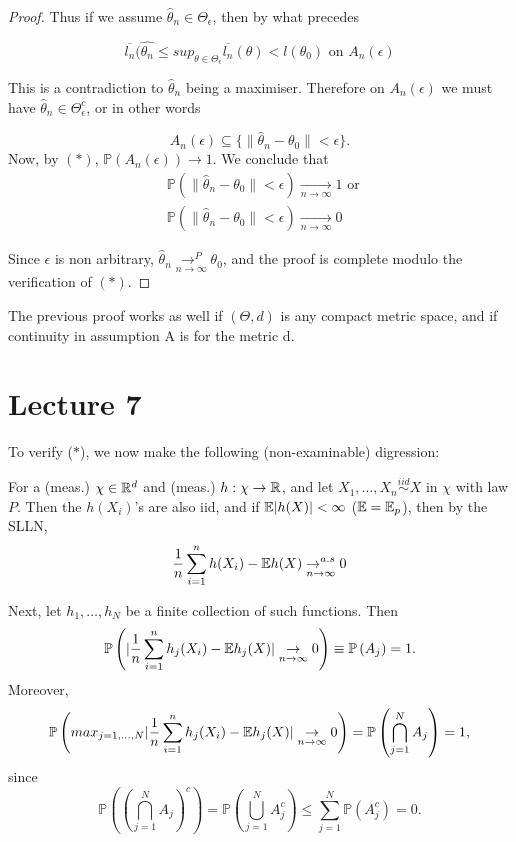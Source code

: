 \documentclass[a4paper]{article}
\begin{document}
\begin{proof}
	Thus if we assume $\hat{\theta}_n \in \Theta_{\epsilon}$, then by what precedes

	\[
		\overline{l_n}(\hat{\theta_n} \le  sup_{\theta \in \Theta_{\epsilon}} \overline{l_n}(\theta) < l(\theta_0) \text{ on } A_n(\epsilon)
	\]

	This is a contradiction to $\hat{\theta}_n$ being a maximiser. Therefore on $A_n(\epsilon)$ we must have  $\hat{\theta}_n \in  \Theta_{\epsilon}^{c}$, or in other words

	\[
		A_n(\epsilon) \subseteq \{\| \hat{\theta}_n - \theta_0\| < \epsilon\} 
	.\] 
	Now, by $(\ast)$,  $\mathbb{P}\left( A_n(\epsilon) \right) \to 1$. We conclude that
	 \begin{align*}
		&\mathbb{P}\left( \| \hat{\theta}_n - \theta_0 \| < \epsilon  \right) \underset{n\to \infty}{\to } 1 \text{ or } \\
		&\mathbb{P}\left( \| \hat{\theta}_n - \theta_0\| < \epsilon \right) \underset{n\to \infty}{\to } 0
	\end{align*}

	Since $\epsilon$ is non arbitrary,  $\hat{\theta}_n \underset{n\to \infty}{\to^{P} } \theta_0$, and the proof is complete modulo the verification of $(\ast)$.
\end{proof}

\begin{remark}
	The previous proof works as well if $(\Theta, d)$ is any compact metric space, and if continuity in assumption A is for the metric d.
\end{remark}

\section{Lecture 7}

To verify ($\ast$), we now make the following (non-examinable) digression:

For a (meas.) $\chi \in \mathbb{R}^{d}$ and (meas.) $h: \chi \to \mathbb{R}$, and let $X_1, \ldots, X_n \stackrel{iid}{\sim} X$ in $\chi$ with law $P$. Then the $h(X_i)$'s are also iid, and if $\mathbb{E} |h(X)| < \infty$ ($\mathbb{E} = \mathbb{E}_p$), then by the SLLN,
\[
	\frac{1}{n} \sum_{i=1}^{n} h(X_i) - \mathbb{E} h(X) \underset{n \to \infty}{\to^{a.s}} 0 
\] 

Next, let $h_1, \ldots, h_N$ be a finite collection of such functions. Then
\[
	\mathbb{P}\left( |\frac{1}{n} \sum_{i=1}^{n} h_j (X_i) - \mathbb{E} h_j (X)  | \underset{n \to \infty}{\to} 0 \right) \equiv \mathbb{P}\left( A_j \right) = 1.
\] 
Moreover,
\[
	\mathbb{P}\left( max_{j=1,\ldots,N} |\frac{1}{n} \sum_{i=1}^{n} h_j (X_i) - \mathbb{E} h_j (X)  | \underset{n \to \infty}{\to} 0 \right) = \mathbb{P}\left( \bigcap_{j=1}^{N} A_j  \right) = 1,
\] since
\[
	\mathbb{P}\left( (\bigcap_{j=1}^{N}A_j)^{c}  \right) = \mathbb{P}\left( \bigcup_{j=1}^{N} A_j^{c}  \right) \le \sum_{j=1}^{N}\mathbb{P}\left( A_j^{c} \right) = 0.
\] 
\end{document}
